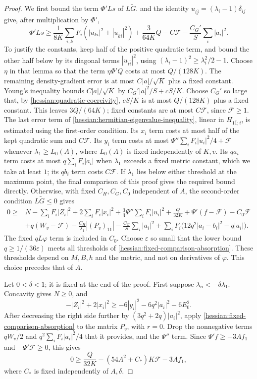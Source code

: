 \begin{proof}
We first bound the term $\Phi'Ls$ of $L\widetilde G$.  and the identity $u_{i\bar j}=(\lambda_i-1)\delta_{ij}$ give, after multiplication by $\Phi'$,
\[
 \Phi'Ls\geq\frac1{8K}\sum_{i,k}F_i(|u_{ki}|^2+|u_{k\bar i}|^2)
             +\frac{3}{64K}Q-C\mathcal F
             -\frac{C_G'}S\sum_i|a_i|^2.
\]
To justify the constants, keep half of the positive quadratic term, and bound the other half below by its diagonal terms $|u_{i\bar i}|^2$, using $(\lambda_i-1)^2\geq\lambda_i^2/2-1$. Choose $\eta$ in that lemma so that the term $\eta\Phi'Q$ costs at most $Q/(128K)$. The remaining density-gradient error is at most $C|a|/\sqrt K$ plus a fixed constant. Young's inequality bounds $C|a|/\sqrt K$ by $C_G'|a|^2/S+cS/K$. Choose $C_G'$ so large that, by \cref{hessian:quadratic-coercivity}, $cS/K$ is at most $Q/(128K)$ plus a fixed constant. This leaves $3Q/(64K)$; fixed constants are at most $C\mathcal F$, since $\mathcal F\geq1$.
The last error term of \cref{hessian:hermitian-eigenvalue-inequality}, linear in $H_{1\bar1;i}$, is estimated using the first-order condition. Its $x_i$ term costs at most half of the kept quadratic sum and $C\mathcal F$. Its $y_i$ term costs at most $\Psi''\sum_iF_i|u_i|^2/4+\mathcal F$ whenever $\lambda_1\geq L_0(A)$, where $L_0(A)$ is fixed independently of $K,v$. Its $qa_i$ term costs at most $q\sum_iF_i|a_i|$ when $\lambda_1$ exceeds a fixed metric constant, which we take at least $1$; its $qb_i$ term costs $C\mathcal F$.
If $\lambda_1$ lies below either threshold at the maximum point, the final comparison of this proof gives the required bound directly. Otherwise, with fixed $C_H,C_G,C_0$ independent of $A$, the second-order condition $L\widetilde G\leq0$ gives
\begin{align*}
 0\geq{}&N-\sum_iF_i|Z_i|^2+2\sum_iF_i|x_i|^2
       +\tfrac34\Psi''\sum_iF_i|u_i|^2+\frac{Q}{32K}
       +\Psi'(f-\mathcal F)-C_0\mathcal F\\
 &+q(W_v-\mathcal F)-\frac{C_H}{\lambda_1}|(P_v)_{1\bar1}|
       -\frac{C_G}S\sum_i|a_i|^2
       +\sum_iF_i\bigl(12q^2|a_i-b_i|^2-q|a_i|\bigr).
\end{align*}
The fixed $qL\varphi$ term is included in $C_0$. Choose $\varepsilon$ so small that the lower bound $q\geq1/(36\varepsilon)$ meets all thresholds of \cref{hessian:fixed-comparison-absorption}. These thresholds depend on $M,B,h$ and the metric, and not on derivatives of $\varphi$. This choice precedes that of $A$.

Let $0<\delta<1$; it is fixed at the end of the proof. First suppose $\lambda_n<-\delta\lambda_1$. Concavity gives $N\geq0$, and
\[
 -|Z_i|^2+2|x_i|^2
     \geq-6|y_i|^2-6q^2|a_i|^2-6E_0^2.
\]
After decreasing the right side further by $(3q^2+2q)|a_i|^2$, apply \cref{hessian:fixed-comparison-absorption} to the matrix $P_v$, with $r=0$. Drop the nonnegative terms $qW_v/2$ and $q^2\sum_iF_i|a_i|^2/4$ that it provides, and the $\Psi''$ term. Since $\Psi'f\geq-3Af_1$ and $-\Psi'\mathcal F\geq0$, this gives
\[
 0\geq\frac{Q}{32K}-(54A^2+C_*)K\mathcal F-3Af_1,
\]
where $C_*$ is fixed independently of $A,\delta$.


\end{proof}
